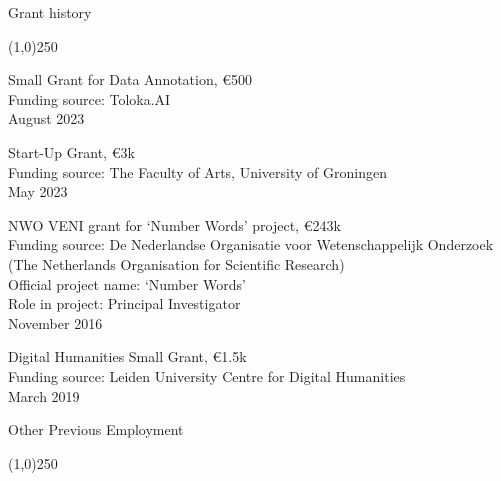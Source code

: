 \documentclass[12pt,letterpaper]{article}
\begin{document}
\vspace{2mm}

\noindent \Large{Grant history}

\vspace{-4mm}
\noindent\line(1,0){250}

\small{
\noindent Small Grant for Data Annotation, \euro{}500 
\vspace{1mm} \\
\noindent Funding source: Toloka.AI\\
\noindent August 2023
}
\vspace{3mm}

\small{
\noindent Start-Up Grant, \euro{}3k 
\vspace{1mm} \\
\noindent Funding source: The Faculty of Arts, University of Groningen\\
\noindent May 2023
}
\vspace{3mm}

\small{
\noindent NWO VENI grant for `Number Words' project, \euro{}243k 
\vspace{1mm} \\
\noindent Funding source: De Nederlandse Organisatie voor Wetenschappelijk Onderzoek (The Netherlands Organisation for Scientific Research)\\
\noindent Official project name: `Number Words' \\
\noindent Role in project: Principal Investigator\\
\noindent November 2016
}
\vspace{3mm}

\small{
\noindent Digital Humanities Small Grant, \euro{}1.5k 
\vspace{1mm} \\
\noindent Funding source: Leiden University Centre for Digital Humanities \\
\noindent March 2019\\
}
\vspace{3mm}

\noindent \Large{Other Previous Employment}

\vspace{-4mm}
\noindent\line(1,0){250}
\end{document}
